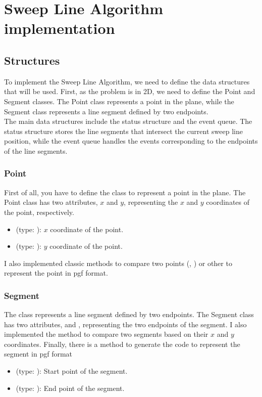 \documentclass[10pt,a4paper,hidelinks]{article}
\begin{document}
\section{Sweep Line Algorithm implementation}
\subsection{Structures}
To implement the Sweep Line Algorithm, we need to define the data structures that will be used. First, as the problem is in 2D, we need to define the Point and Segment classes. The Point class represents a point in the plane, while the Segment class represents a line segment defined by two endpoints.\\

The main data structures include the status structure and the event queue. The status structure stores the line segments that intersect the current sweep line position, while the event queue handles the events corresponding to the endpoints of the line segments.

\subsubsection{Point}
First of all, you have to define the  class to represent a point in the plane. The Point class has two attributes, $x$ and $y$, representing the $x$ and $y$ coordinates of the point, respectively.
\begin{itemize}
    \item {} (type: ): $x$ coordinate of the point.
    \item {} (type: ): $y$ coordinate of the point.
\end{itemize}

I also implemented classic methods to compare two points (, ) or other to represent the point in pgf format.
\subsubsection{Segment}
The  class represents a line segment defined by two endpoints. The Segment class has two attributes,  and , representing the two endpoints of the segment. I also implemented the  method to compare two segments based on their $x$ and $y$ coordinates. Finally, there is a method to generate the code to represent the segment in pgf format
\begin{itemize}
    \item {} (type: ): Start point of the segment.
    \item {} (type: ): End point of the segment.
\end{itemize}

\end{document}

